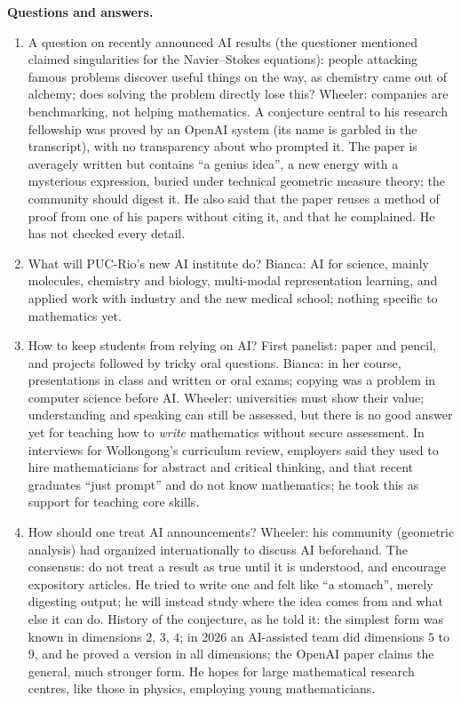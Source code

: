 \medskip\noindent
{\bf Questions and answers.}
\begin{enumerate}
\item A question on recently announced AI
results (the questioner mentioned claimed
singularities for the Navier--Stokes
equations): people attacking famous
problems discover useful things on the way,
as chemistry came out of alchemy; does
solving the problem directly lose this?
Wheeler: companies are benchmarking, not
helping mathematics. A conjecture central
to his research fellowship was proved by an
OpenAI system (its name is garbled in the
transcript), with no transparency about who
prompted it. The paper is averagely written
but contains ``a genius idea'', a new energy
with a mysterious expression, buried under
technical geometric measure theory; the
community should digest it. He also said
that the paper reuses a method of proof from
one of his papers without citing it, and
that he complained. He has not checked every
detail.
\item What will PUC-Rio's new AI institute
do? Bianca: AI for science, mainly
molecules, chemistry and biology,
multi-modal representation learning, and
applied work with industry and the new
medical school; nothing specific to
mathematics yet.
\item How to keep students from relying on
AI? First panelist: paper and pencil, and
projects followed by tricky oral questions.
Bianca: in her course, presentations in
class and written or oral exams; copying was
a problem in computer science before AI.
Wheeler: universities must show their value;
understanding and speaking can still be
assessed, but there is no good answer yet
for teaching how to \emph{write} mathematics
without secure assessment. In interviews for
Wollongong's curriculum review, employers
said they used to hire mathematicians for
abstract and critical thinking, and that
recent graduates ``just prompt'' and do not
know mathematics; he took this as support
for teaching core skills.
\item How should one treat AI announcements?
Wheeler: his community (geometric analysis)
had organized internationally to discuss AI
beforehand. The consensus: do not treat a
result as true until it is understood, and
encourage expository articles. He tried to
write one and felt like ``a stomach'',
merely digesting output; he will instead
study where the idea comes from and what
else it can do. History of the conjecture,
as he told it: the simplest form was known
in dimensions $2$, $3$, $4$; in 2026 an
AI-assisted team did dimensions $5$ to $9$,
and he proved a version in all dimensions;
the OpenAI paper claims the general, much
stronger form. He hopes for large
mathematical research centres, like those in
physics, employing young mathematicians.
\end{enumerate}

